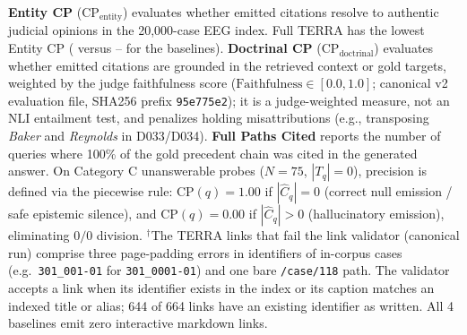 \textbf{Entity CP} ($\text{CP}_{\text{entity}}$) evaluates whether emitted citations resolve to authentic judicial opinions in the 20,000-case EEG index. Full TERRA has the lowest Entity CP (\CatBTerraEntityCitationPrecision{} versus \CatBGraphRAGEntityCitationPrecision{}--\CatBDirectEntityCitationPrecision{} for the baselines). 
\textbf{Doctrinal CP} ($\text{CP}_{\text{doctrinal}}$) evaluates whether emitted citations are grounded in the retrieved context or gold targets, weighted by the judge faithfulness score ($\text{Faithfulness} \in [0.0, 1.0]$; canonical v2 evaluation file, SHA256 prefix \texttt{95e775e2}); it is a judge-weighted measure, not an NLI entailment test, and penalizes holding misattributions (e.g., transposing \textit{Baker} and \textit{Reynolds} in D033/D034). 
\textbf{Full Paths Cited} reports the number of queries where 100\% of the gold precedent chain was cited in the generated answer. 
On Category C unanswerable probes ($N=75$, $|T_q|=0$), precision is defined via the piecewise rule: $\text{CP}(q) = 1.00$ if $|\hat{C}_q|=0$ (correct null emission / safe epistemic silence), and $\text{CP}(q) = 0.00$ if $|\hat{C}_q|>0$ (hallucinatory emission), eliminating $0/0$ division. 
$^\dagger$The \TerraBrokenMarkdownLinks{} TERRA links that fail the link validator (canonical run) comprise three page-padding errors in identifiers of in-corpus cases (e.g.\ \texttt{301\_001-01} for \texttt{301\_0001-01}) and one bare \texttt{/case/118} path. The validator accepts a link when its identifier exists in the index or its caption matches an indexed title or alias; 644 of 664 links have an existing identifier as written. All 4 baselines emit zero interactive markdown links.